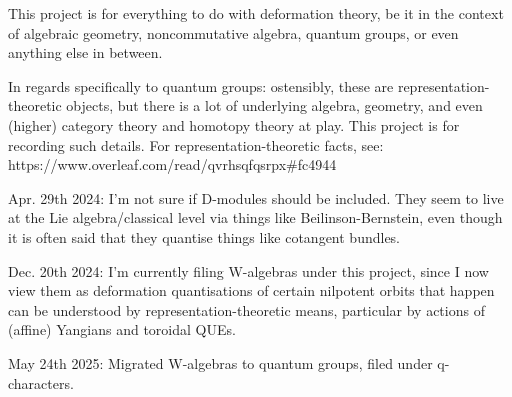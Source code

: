 This project is for everything to do with deformation theory, be it in the context of algebraic geometry, noncommutative algebra, quantum groups, or even anything else in between.

In regards specifically to quantum groups: ostensibly, these are representation-theoretic objects, but there is a lot of underlying algebra, geometry, and even (higher) category theory and homotopy theory at play. This project is for recording such details. For representation-theoretic facts, see:
    https://www.overleaf.com/read/qvrhsqfqsrpx#fc4944

Apr. 29th 2024: I'm not sure if D-modules should be included. They seem to live at the Lie algebra/classical level via things like Beilinson-Bernstein, even though it is often said that they quantise things like cotangent bundles. 

Dec. 20th 2024: I'm currently filing W-algebras under this project, since I now view them as deformation quantisations of certain nilpotent orbits that happen can be understood by representation-theoretic means, particular by actions of (affine) Yangians and toroidal QUEs.

May 24th 2025: Migrated W-algebras to quantum groups, filed under q-characters.